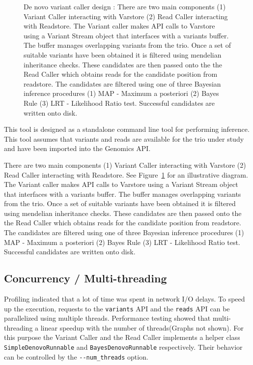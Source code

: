 \documentclass{article}
\begin{document}
\begin{figure}
\caption{ De novo variant caller design : There are two main components (1) Variant Caller interacting with Varstore (2) Read Caller interacting with Readstore. The Variant caller makes API calls to Varstore using a Variant Stream object that interfaces with a variants buffer. The buffer manages overlapping variants from the trio. Once a set of suitable variants have been obtained it is filtered using mendelian inheritance checks. These candidates are then passed onto the the Read Caller which obtains reads for the candidate position from readstore. The candidates are filtered using one of three Bayesian inference procedures (1) MAP - Maximum a posteriori (2) Bayes Rule (3) LRT - Likelihood Ratio test. Successful candidates are written onto disk.}
\label{fig:design}
\end{figure}

This tool is designed as a standalone command line tool for performing inference. This tool assumes that variants and reads are available for the trio under study and have been imported into the Genomics API. 

\vspace{1em}
There are two main components (1) Variant Caller interacting with Varstore (2) Read Caller interacting with Readstore. See Figure~\ref{fig:design} for an illustrative diagram. The Variant caller makes API calls to Varstore using a Variant Stream object that interfaces with a variants buffer. The buffer manages overlapping variants from the trio. Once a set of suitable variants have been obtained it is filtered using mendelian inheritance checks. These candidates are then passed onto the the Read Caller which obtains reads for the candidate position from readstore. The candidates are filtered using one of three Bayesian inference procedures (1) MAP - Maximum a posteriori (2) Bayes Rule (3) LRT - Likelihood Ratio test. Successful candidates are written onto disk.

\subsection{Concurrency / Multi-threading}
Profiling indicated that a lot of time was spent in network I/O delays. To speed up the execution, requests to the \verb|variants| API and the \verb|reads| API can be parallelized using multiple threads. Performance testing showed that multi-threading a linear speedup with the number of threads(Graphs not shown). For this purpose the Variant Caller and the Read Caller implements a helper class \verb|SimpleDenovoRunnable| and \verb|BayesDenovoRunnable| respectively. Their behavior can be controlled by the \verb|--num_threads| option.
\end{document}
